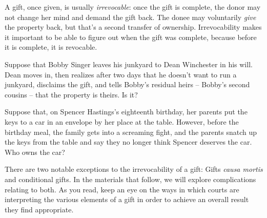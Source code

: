 A gift, once given, is usually \textit{irrevocable}: once the gift is complete,
the donor may not change her mind and demand the gift back.  The donee may
voluntarily \textit{give} the property back, but that's a second transfer of
ownership.  Irrevocability makes it important to be able to figure out when the
gift was complete, because before it is complete, it is revocable.  

Suppose that Bobby Singer leaves his junkyard to Dean Winchester in his will. 
Dean moves in, then realizes after two days that he doesn't want to run a
junkyard, disclaims the gift, and tells Bobby's residual heirs -- Bobby's
second cousins -- that the property is theirs.  Is it?

Suppose that, on Spencer Hastings's eighteenth birthday, her parents put the
keys to a car in an envelope by her place at the table.  However, before the
birthday meal, the family gets into a screaming fight, and the parents snatch
up the keys from the table and say they no longer think Spencer deserves the
car.  Who owns the car? 

There are two notable exceptions to the irrevocability of a gift: Gifts
\textit{causa mortis} and conditional gifts.  In the materials that follow, we
will explore complications relating to both.  As you read, keep an eye on the
ways in which courts are interpreting the various elements of a gift in order
to achieve an overall result they find appropriate.

